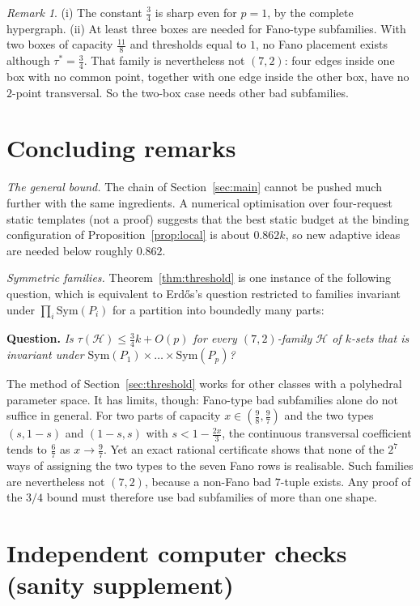 \documentclass[11pt]{amsart}
\theoremstyle{definition}
\theoremstyle{remark}
\newtheorem{remark}[theorem]{Remark}
\begin{document}
\begin{remark}\label{rem:threshold}
(i) The constant $\frac34$ is sharp even for $p=1$, by the complete hypergraph.
(ii) At least three boxes are needed for Fano-type subfamilies. With two boxes of capacity $\frac{11}8$ and thresholds equal to $1$, no Fano placement exists although $\tau^*=\frac34$. That family is nevertheless not $(7,2)$: four edges inside one box with no common point, together with one edge inside the other box, have no $2$-point transversal. So the two-box case needs other bad subfamilies.
\end{remark}


\section{Concluding remarks}

\emph{The general bound.} The chain of Section~\ref{sec:main} cannot be pushed much further with the same ingredients. A numerical optimisation over four-request static templates (not a proof) suggests that the best static budget at the binding configuration of Proposition~\ref{prop:local} is about $0.862k$, so new adaptive ideas are needed below roughly $0.862$.

\emph{Symmetric families.} Theorem~\ref{thm:threshold} is one instance of the following question, which is equivalent to Erd\H{o}s's question restricted to families invariant under $\prod_i\mathrm{Sym}(P_i)$ for a partition into boundedly many parts:

\smallskip
\noindent\textbf{Question.} \emph{Is $\tau(\mathcal H)\le\frac34k+O(p)$ for every $(7,2)$-family $\mathcal H$ of $k$-sets that is invariant under $\mathrm{Sym}(P_1)\times\dots\times\mathrm{Sym}(P_p)$?}
\smallskip

The method of Section~\ref{sec:threshold} works for other classes with a polyhedral parameter space. It has limits, though: Fano-type bad subfamilies alone do not suffice in general. For two parts of capacity $x\in(\frac98,\frac97)$ and the two types $(s,1-s)$ and $(1-s,s)$ with $s<1-\frac{2x}3$, the continuous transversal coefficient tends to $\frac67$ as $x\to\frac97$. Yet an exact rational certificate shows that none of the $2^7$ ways of assigning the two types to the seven Fano rows is realisable. Such families are nevertheless not $(7,2)$, because a non-Fano bad $7$-tuple exists. Any proof of the $3/4$ bound must therefore use bad subfamilies of more than one shape.

\appendix
\section{Independent computer checks (sanity supplement)}\label{app:checks}
\end{document}
